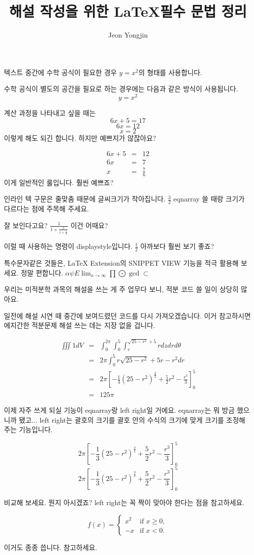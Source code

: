 \documentclass{article}
\author{Jeon Yongjin}
\title{해설 작성을 위한 \LaTeX 필수 문법 정리}
\date{}
\begin{document}
\maketitle

텍스트 중간에 수학 공식이 필요한 경우 \( y=x^2 \)의 형태를 사용합니다.


수학 공식이 별도의 공간을 필요로 하는 경우에는 다음과 같은 방식이 사용됩니다. \[ y=x^2 \]

계산 과정을 나타내고 싶을 때는
\[6x + 5 = 17\]
\[6x = 12\]
\[x = 2\]
이렇게 해도 되긴 합니다. 하지만 예쁘지가 않잖아요?

\begin{eqnarray*}
    6x + 5 &=& 12 \\
    6x &=& 7 \\
    x &=& \frac{7}{6}
\end{eqnarray*}
이게 일반적인 룰입니다. 훨씬 예쁘죠?

인라인 텍 구문은 줄맞춤 때문에 글씨크기가 작아집니다. \( \frac{3}{2} \) eqnarray 쓸 때랑 크기가 다르다는 점에 주목해 주세요.

잘 보인다고요? \(\frac{1}{1+\frac{1}{1+\frac{1}{2}}}\) 이건 어때요?

이럴 때 사용하는 명령이 displaystyle입니다. \( \displaystyle \frac{1}{2} \) 아까보다 훨씬 보기 좋죠?

특수문자같은 것들은, LaTeX Extension의 SNIPPET VIEW 기능을 적극 활용해 보세요. 정말 편합니다.
\(\alpha \psi E \lim_{x \to \infty} \prod \bigodot \gcd \subset \)

우리는 미적분학 과목의 해설을 쓰는 게 주 업무다 보니, 적분 코드 쓸 일이 상당히 많아요.

일전에 해설 시연 때 중간에 보여드렸던 코드를 다시 가져오겠습니다. 이거 참고하시면 에지간한 적분문제 해설 쓰는 데는 지장 없을 겁니다.

\begin{eqnarray*}
    \iiint 1 dV &=& \int_{0}^{2\pi} \int_{0}^{5} \int_{r}^{\sqrt{25-r^2}+5} r dz dr d\theta \\
    &=& 2\pi \int_{0}^{5} r\sqrt{25-r^2} + 5r -r^2 dr \\
    &=& 2\pi \left[ -\frac{1}{3}(25-r^2)^{\frac{3}{2}} + \frac{5}{2}r^2 - \frac{r^3}{3} \right]_{0}^{5} \\
    &=& 125\pi
\end{eqnarray*}

이제 자주 쓰게 되실 기능이 eqnarray랑 left right일 거에요. eqnarray는 뭐 방금 했으니까 됐고...
left right는 괄호의 크기를 괄호 안의 수식의 크기에 맞게 크기를 조정해 주는 기능입니다.
    
\[ 2\pi [-\frac{1}{3}(25-r^2)^{\frac{3}{2}} + \frac{5}{2}r^2 - \frac{r^3}{3}]_{0}^{5} \]
\[ 2\pi \left[ -\frac{1}{3}(25-r^2)^{\frac{3}{2}} + \frac{5}{2}r^2 - \frac{r^3}{3} \right]_{0}^{5} \]

비교해 보세요. 뭔지 아시겠죠?
left right는 꼭 짝이 맞아야 한다는 점을 참고하세요.

\[
f(x) =
\begin{cases} 
x^2 & \text{if } x \geq 0, \\
-x  & \text{if } x < 0.
\end{cases}
\]

이거도 종종 씁니다. 참고하세요.
\end{document}
